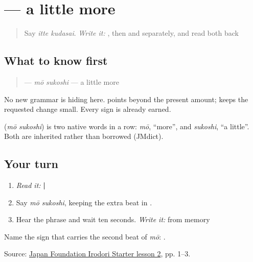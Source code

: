 \section[\texorpdfstring{\ja{もうすこし} (mō sukoshi)}{もうすこし (mō sukoshi)}]{ — a little more}

\label{lesson:JA-C10-mou-sukoshi}



\begin{quote}
Say \emph{itte kudasai}. \emph{Write it:} \textbf{}, then \textbf{} and \textbf{} separately, and read both back
\end{quote}

\subsection*{What to know first}
\begin{quote}
\textbf{} — \emph{mō sukoshi} — a little more
\end{quote}

No new grammar is hiding here. \textbf{} points beyond the present amount; \textbf{} keeps the requested change small. Every sign is already earned.

\begin{cousinweb}
\textbf{} (\emph{mō sukoshi}) is two native words in a row: \emph{mō}, \textquotedblleft{}more\textquotedblright{}, and \emph{sukoshi}, \textquotedblleft{}a little\textquotedblright{}. Both are inherited rather than borrowed (JMdict).
\end{cousinweb}

\subsection*{Your turn}
\begin{enumerate}
\raggedright
  \item \emph{Read it:} \textbf{ | }
  \item Say \emph{mō sukoshi}, keeping the extra beat in \textbf{}.
  \item Hear the phrase and wait ten seconds. \emph{Write it:} \textbf{} from memory
\end{enumerate}

\begin{tcolorbox}[breakable,colback=teal!4,colframe=teal!35!black,title={Before you move on}]
Name the sign that carries the second beat of \emph{mō}: \textbf{}.

Source: \href{https://www.irodori.jpf.go.jp/assets/data/starter/pdf/X\_L02.pdf}{Japan Foundation Irodori Starter lesson 2}, pp. 1–3.
\end{tcolorbox}
